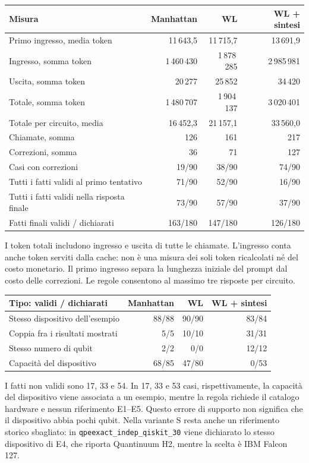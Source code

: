 \documentclass[a4paper,10pt]{article}
\begin{document}
\begin{tabularx}{\linewidth}{Xrrr}\toprule
Misura & Manhattan & WL & WL + sintesi\\\midrule
Primo ingresso, media token & 11\,643,5 & 11\,715,7 & 13\,691,9\\
Ingresso, somma token & 1\,460\,430 & 1\,878\,285 & 2\,985\,981\\
Uscita, somma token & 20\,277 & 25\,852 & 34\,420\\
Totale, somma token & 1\,480\,707 & 1\,904\,137 & 3\,020\,401\\
Totale per circuito, media & 16\,452,3 & 21\,157,1 & 33\,560,0\\
Chiamate, somma & 126 & 161 & 217\\
Correzioni, somma & 36 & 71 & 127\\
Casi con correzioni & 19/90 & 38/90 & 74/90\\
Tutti i fatti validi al primo tentativo & 71/90 & 52/90 & 16/90\\
Tutti i fatti validi nella risposta finale & 73/90 & 57/90 & 37/90\\
Fatti finali validi / dichiarati & 163/180 & 147/180 & 126/180\\
\bottomrule\end{tabularx}\endgroup\par
I token totali includono ingresso e uscita di tutte le chiamate.
L'ingresso conta anche token serviti dalla cache: non è una misura dei soli token
ricalcolati né del costo monetario.
Il primo ingresso separa la lunghezza iniziale del prompt dal costo delle correzioni.
Le regole consentono al massimo tre risposte per circuito.
\par\medskip\begingroup\small\renewcommand{\arraystretch}{1.18}\setlength{\tabcolsep}{5pt}
\begin{tabularx}{\linewidth}{Xrrr}\toprule
Tipo: validi / dichiarati & Manhattan & WL & WL + sintesi\\\midrule
Stesso dispositivo dell'esempio & 88/88 & 90/90 & 83/84\\
Coppia fra i risultati mostrati & 5/5 & 10/10 & 31/31\\
Stesso numero di qubit & 2/2 & 0/0 & 12/12\\
Capacità del dispositivo & 68/85 & 47/80 & 0/53\\
\bottomrule\end{tabularx}\endgroup\par
I fatti non validi sono 17, 33 e 54. In 17, 33 e 53 casi,
rispettivamente, la capacità del dispositivo viene associata a un esempio,
mentre la regola richiede il catalogo hardware e nessun riferimento E1--E5.
Questo errore di supporto non significa che il dispositivo abbia pochi qubit.
Nella variante S resta anche un riferimento storico sbagliato:
in \texttt{qpeexact\_indep\_qiskit\_30} viene dichiarato lo stesso dispositivo
di E4, che riporta Quantinuum H2, mentre la scelta è IBM Falcon 127.
\end{document}

